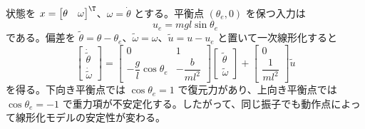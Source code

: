 状態を $x=\begin{bmatrix}\theta&\omega\end{bmatrix}^\T$、$\omega=\dot{\theta}$ とする。平衡点 $(\theta_e,0)$ を保つ入力は
\begin{equation}
  u_e=mgl\sin\theta_e
\end{equation}
である。偏差を $\tilde{\theta}=\theta-\theta_e$、$\tilde{\omega}=\omega$、$\tilde{u}=u-u_e$ と置いて一次線形化すると
\begin{equation}
  \begin{bmatrix}
    \dot{\tilde{\theta}}\\
    \dot{\tilde{\omega}}
  \end{bmatrix}
  =
  \begin{bmatrix}
    0&1\\
    -\dfrac{g}{l}\cos\theta_e&-\dfrac{b}{ml^2}
  \end{bmatrix}
  \begin{bmatrix}
    \tilde{\theta}\\
    \tilde{\omega}
  \end{bmatrix}
  +
  \begin{bmatrix}
    0\\
    \dfrac{1}{ml^2}
  \end{bmatrix}
  \tilde{u}
\end{equation}
を得る。下向き平衡点では $\cos\theta_e=1$ で復元力があり、上向き平衡点では $\cos\theta_e=-1$ で重力項が不安定化する。したがって、同じ振子でも動作点によって線形化モデルの安定性が変わる。

